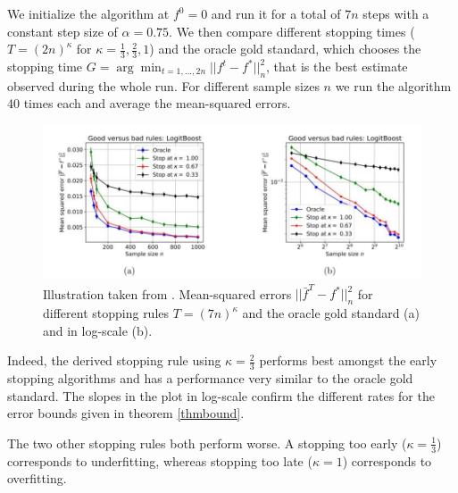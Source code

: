 We initialize the algorithm at $f^0=0$ and run it for a total of $7n$ steps with a constant step size of $\alpha=0.75$. We then compare different stopping times ($T=(2n)^{\kappa}$ for $\kappa=\frac{1}{3},\frac{2}{3},1$) and the oracle gold standard, which chooses the stopping time $G=\operatorname{arg}\min_{t=1,...,2n}||f^t-f^*||_n^2$, that is the best estimate observed during the whole run. For different sample sizes $n$ we run the algorithm 40 times each and average the mean-squared errors.

\begin{figure}
  \includegraphics[width=\textwidth]{img/early_stopping_logit_plot.jpg}
  \caption{Illustration taken from \cite{wain17ada}. Mean-squared errors $||\bar{f}^T-f^*||_n^2$ for different stopping rules $T=(7n)^{\kappa}$ and the oracle gold standard (a) and in log-scale (b).}
  \label{l2boost}
\end{figure}

Indeed, the derived stopping rule using $\kappa=\frac{2}{3}$ performs best amongst the early stopping algorithms and has a performance very similar to the oracle gold standard. The slopes in the plot in log-scale confirm the different rates for the error bounds given in theorem \ref{thmbound}.

The two other stopping rules both perform worse. A stopping too early ($\kappa=\frac{1}{3}$) corresponds to underfitting, whereas stopping too late ($\kappa=1$) corresponds to overfitting.

